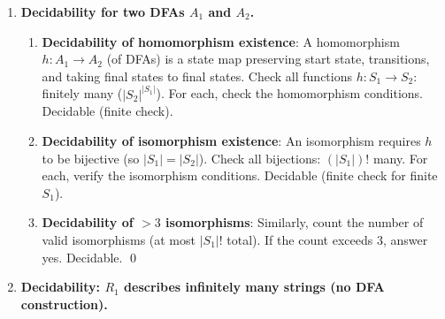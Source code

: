 \begin{enumerate}[{12.}1. ]
\begin{enumerate}
\item \textbf{All accepted strings have all complete paths to final states}: More complex, but still decidable: check if the complement of this property is empty. Using DFA $A^d$ (subset construction), acceptance corresponds to subsets containing at least one final state. Check if any reachable subset in $A^d$ contains both a final and a nonfinal state of $A$. Decidable.

\item \textbf{All strings have unique paths}: A string has a unique path iff the NDFA is deterministic on that string (no two applicable transitions from any state on any symbol along the path). Check: for each state $q$ and symbol $a$, if $|\delta(q,a)| > 1$ or there are $\lambda$-move alternatives, the NDFA is nondeterministic on some strings. More carefully: check if any string leads to a state with multiple transition choices. Decidable (check transitions structure). \qed
\end{enumerate}

\item \textbf{Decidability for two DFAs $A_1$ and $A_2$.}

\begin{enumerate}
\item \textbf{Decidability of homomorphism existence}: A homomorphism $h: A_1\to A_2$ (of DFAs) is a state map preserving start state, transitions, and taking final states to final states. Check all functions $h: S_1\to S_2$: finitely many ($|S_2|^{|S_1|}$). For each, check the homomorphism conditions. Decidable (finite check).

\item \textbf{Decidability of isomorphism existence}: An isomorphism requires $h$ to be bijective (so $|S_1|=|S_2|$). Check all bijections: $(|S_1|)!$ many. For each, verify the isomorphism conditions. Decidable (finite check for finite $S_1$).

\item \textbf{Decidability of $>3$ isomorphisms}: Similarly, count the number of valid isomorphisms (at most $|S_1|!$ total). If the count exceeds 3, answer yes. Decidable. \qed
\end{enumerate}

\item \textbf{Decidability: $R_1$ describes infinitely many strings (no DFA construction).}


\end{enumerate}
